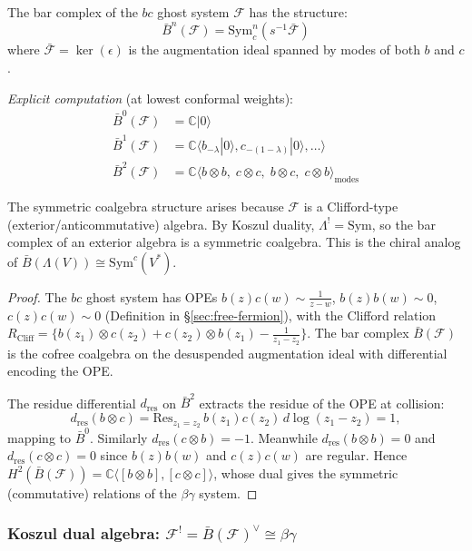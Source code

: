 \begin{proposition}
\label{prop:bar-bc-system}
The bar complex of the $bc$ ghost system $\mathcal{F}$ has the structure:
\[\bar{B}^n(\mathcal{F}) = \mathrm{Sym}^n_c(s^{-1}\bar{\mathcal{F}})\]
where $\bar{\mathcal{F}} = \ker(\epsilon)$ is the augmentation ideal spanned by modes of both $b$ and $c$.

\emph{Explicit computation} (at lowest conformal weights):
\begin{align}
\bar{B}^0(\mathcal{F}) &= \mathbb{C}|0\rangle \\
\bar{B}^1(\mathcal{F}) &= \mathbb{C}\langle b_{-\lambda}|0\rangle, c_{-(1-\lambda)}|0\rangle, \ldots \rangle \\
\bar{B}^2(\mathcal{F}) &= \mathbb{C}\langle b \otimes b,\; c \otimes c,\; b \otimes c,\; c \otimes b \rangle_{\text{modes}}
\end{align}

The symmetric coalgebra structure arises because $\mathcal{F}$ is a Clifford-type (exterior/anticommutative) algebra.  By Koszul duality, $\Lambda^! = \mathrm{Sym}$, so the bar complex of an exterior algebra is a symmetric coalgebra.  This is the chiral analog of $\bar{B}(\Lambda(V)) \cong \mathrm{Sym}^c(V^*)$.
\end{proposition}

\begin{proof}
The $bc$ ghost system has OPEs $b(z)c(w) \sim \frac{1}{z-w}$, $b(z)b(w) \sim 0$, $c(z)c(w) \sim 0$ (Definition in \S\ref{sec:free-fermion}), with the Clifford relation
$R_{\mathrm{Cliff}} = \{b(z_1) \otimes c(z_2) + c(z_2) \otimes b(z_1) - \frac{1}{z_1-z_2}\}$.
The bar complex $\bar{B}(\mathcal{F})$ is the cofree coalgebra on the desuspended augmentation ideal with differential encoding the OPE.

The residue differential $d_{\mathrm{res}}$ on $\bar{B}^2$ extracts the
residue of the OPE at collision:
\[
d_{\mathrm{res}}(b \otimes c)
= \mathrm{Res}_{z_1 = z_2}\, b(z_1)c(z_2)\, d\log(z_1 - z_2) = 1,
\]
mapping to $\bar{B}^0$.  Similarly
$d_{\mathrm{res}}(c \otimes b) = -1$.  Meanwhile
$d_{\mathrm{res}}(b \otimes b) = 0$ and
$d_{\mathrm{res}}(c \otimes c) = 0$ since $b(z)b(w)$ and $c(z)c(w)$ are regular.
Hence $H^2(\bar{B}(\mathcal{F}))
= \mathbb{C}\langle [b \otimes b], [c \otimes c] \rangle$,
whose dual gives the symmetric (commutative) relations of the $\beta\gamma$ system.
\end{proof}

\subsubsection{\texorpdfstring{Koszul dual algebra: $\mathcal{F}^! = \bar{B}(\mathcal{F})^\vee \cong \beta\gamma$}{Koszul dual algebra: F! = B(F)v = beta-gamma}}

